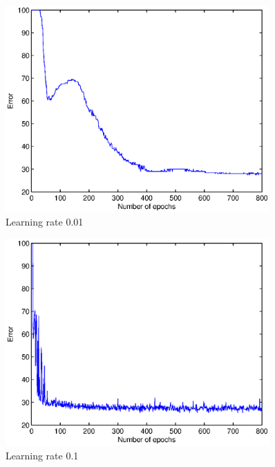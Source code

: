 \documentclass[a4paper]{article}
\begin{document}
\begin{itemize}
	\begin{tcolorbox}
		\begin{figure}[H]
			\begin{center}
				\includegraphics[width=0.9\textwidth]{learningrate001.eps}
				\caption{ Learning rate 0.01}\label{fig:learn0.01}
			\end{center}
		\end{figure}
	\end{tcolorbox}
	
	\begin{tcolorbox}
		\begin{figure}[H]
			\begin{center}
				\includegraphics[width=0.9\textwidth]{learningrate01.eps}
				\caption{ Learning rate 0.1}\label{fig:learn0.1}
			\end{center}
		\end{figure}
	\end{tcolorbox}
	

\end{itemize}
\end{document}
